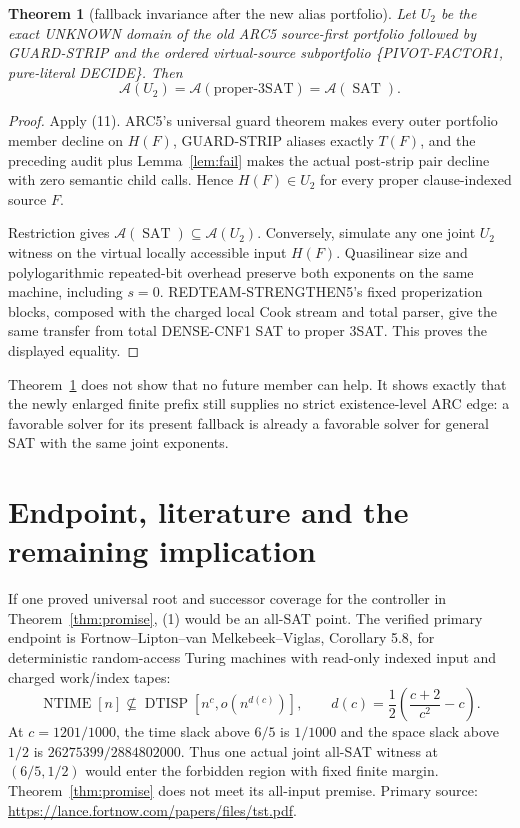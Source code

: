 \documentclass[11pt]{article}
\newtheorem{theorem}{Theorem}
\newcommand{\SAT}{\operatorname{SAT}}
\newcommand{\A}{\mathcal A}
\begin{document}
\begin{theorem}[fallback invariance after the new alias portfolio]
\label{thm:fallback}
Let $U_2$ be the exact UNKNOWN domain of the old ARC5 source-first portfolio
followed by GUARD-STRIP and the ordered virtual-source subportfolio
\{PIVOT-FACTOR1, pure-literal DECIDE\}.  Then
\[
 \boxed{\A(U_2)=\A(\text{proper-3SAT})=\A(\SAT).}         \tag{12}
\]
\end{theorem}
\begin{proof}
Apply (11).  ARC5's universal guard theorem makes every outer portfolio
member decline on $H(F)$, GUARD-STRIP aliases exactly $T(F)$, and the
preceding audit plus Lemma~\ref{lem:fail} makes the actual post-strip pair
decline with zero semantic child calls.  Hence $H(F)\in U_2$ for every
proper clause-indexed source $F$.

Restriction gives $\A(\SAT)\subseteq\A(U_2)$.  Conversely, simulate any
one joint $U_2$ witness on the virtual locally accessible input $H(F)$.
Quasilinear size and polylogarithmic repeated-bit overhead preserve both
exponents on the same machine, including $s=0$.  REDTEAM-STRENGTHEN5's fixed
properization blocks, composed with the charged local Cook stream and total
parser, give the same transfer from total DENSE-CNF1 SAT to proper 3SAT.
This proves the displayed equality.
\end{proof}

Theorem~\ref{thm:fallback} does not show that no future member can help.  It
shows exactly that the newly enlarged finite prefix still supplies no strict
existence-level ARC edge: a favorable solver for its present fallback is
already a favorable solver for general SAT with the same joint exponents.

\section{Endpoint, literature and the remaining implication}
If one proved universal root and successor coverage for the controller in
Theorem~\ref{thm:promise}, (1) would be an all-SAT point.  The verified
primary endpoint is Fortnow--Lipton--van Melkebeek--Viglas, Corollary 5.8,
for deterministic random-access Turing machines with read-only indexed input
and charged work/index tapes:
\[
 \operatorname{NTIME}[n]\not\subseteq
\operatorname{DTISP}[n^c,o(n^{d(c)})],\qquad
 d(c)=\frac12\left(\frac{c+2}{c^2}-c\right).             \tag{13}
\]
At $c=1201/1000$, the time slack above $6/5$ is $1/1000$ and the
space slack above $1/2$ is $26275399/2884802000$.  Thus one actual joint
all-SAT witness at $(6/5,1/2)$ would enter the forbidden region with fixed
finite margin.  Theorem~\ref{thm:promise} does not meet its all-input premise.
Primary source: \url{https://lance.fortnow.com/papers/files/tst.pdf}.
\end{document}
